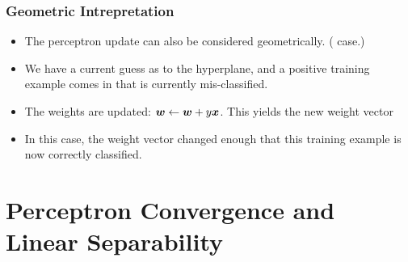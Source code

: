 \documentclass[trans]{beamer}
\begin{document}
\begin{frame}
  \frametitle{Geometric Intrepretation}
\begin{itemize}
\item
The perceptron update can also be considered geometrically.  ( case.) 
\item We have a current
guess as to the hyperplane, and  a positive training example comes in
that is currently mis-classified.  
\item The weights are updated: ${\boldsymbol{w}}
\leftarrow {\boldsymbol{w}} + y {\boldsymbol{x}}$.  This yields the new weight vector
\item In this case, the weight vector changed enough
that this training example is now correctly classified.
\end{itemize}
\end{frame}




\section{Perceptron Convergence and Linear Separability}
\end{document}
